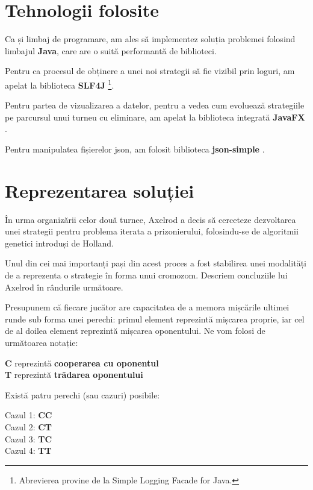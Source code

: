 \section{Tehnologii folosite}

Ca și limbaj de programare, am ales să implementez soluția problemei folosind limbajul \textbf{Java}, care are o suită performantă de biblioteci. 

Pentru ca procesul de obținere a unei noi strategii să fie vizibil prin loguri, am apelat la biblioteca \textbf{SLF4J} \cite{slf4j}\footnote{Abrevierea provine de la Simple Logging Facade for Java.}. 

Pentru partea de vizualizarea a datelor, pentru a vedea cum evoluează strategiile pe parcursul unui turneu cu eliminare, am apelat la biblioteca integrată \textbf{JavaFX} \cite{javaFX}. 

Pentru manipulatea fișierelor json, am folosit biblioteca \textbf{json-simple} \cite{json-simple}.  

\section{Reprezentarea soluției}

În urma organizării celor două turnee, Axelrod \cite{the_evolution_of_cooperation_axelrod} a decis să cerceteze dezvoltarea unei strategii pentru problema iterata a prizonierului, folosindu-se de algoritmii genetici introduși de Holland. 

Unul din cei mai importanți pași din acest proces a fost stabilirea unei modalități de a reprezenta o strategie în forma unui cromozom. Descriem concluziile lui Axelrod în rândurile următoare.

Presupunem că fiecare jucător are capacitatea de a memora mișcările ultimei runde sub forma unei perechi: primul element reprezintă mișcarea proprie, iar cel de al doilea element reprezintă mișcarea oponentului. Ne vom folosi de următoarea notație:

\begin{center}
	\textbf{C} reprezintă \textbf{cooperarea cu oponentul}\\
	\textbf{T} reprezintă \textbf{trădarea oponentului}  
\end{center}

Există patru perechi (sau cazuri) posibile:\\

\begin{center}
	Cazul 1: \textbf{CC}\\
	Cazul 2: \textbf{CT}\\
	Cazul 3: \textbf{TC}\\
	Cazul 4: \textbf{TT}\\
\end{center}

